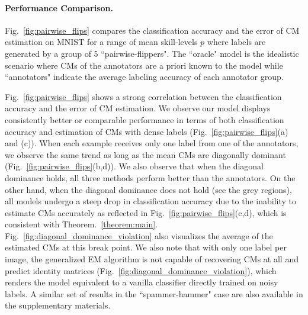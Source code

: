 \paragraph{Performance Comparison.} Fig.~\ref{fig:pairwise_flips} compares the classification accuracy and the error of CM estimation on MNIST for a range of mean skill-levels $p$ where labels are generated by a group of 5 ``pairwise-flippers". The ``oracle" model is the idealistic scenario where CMs of the annotators are a priori known to the model while ``annotators" indicate the average labeling accuracy of each annotator group.

Fig.~\ref{fig:pairwise_flips} shows a strong correlation between the classification accuracy and the error of CM estimation. We observe our model displays consistently better or comparable performance in terms of both classification accuracy and estimation of CMs with dense labels (Fig.~\ref{fig:pairwise_flips}(a) and (c)). When each example receives only one label from one of the annotators, we observe the same trend as long as the mean CMs are diagonally dominant (Fig.~\ref{fig:pairwise_flips}(b,d)). We also observe that when the diagonal dominance holds, all three methods perform better than the annotators. On the other hand, when the diagonal dominance does not hold (see the grey regions), all models undergo a steep drop in classification accuracy due to the inability to estimate CMs accurately as reflected in Fig.~\ref{fig:pairwise_flips}(c,d), which is consistent with Theorem.~\ref{theorem:main}. Fig.~\ref{fig:diagonal_dominance_violation} also visualizes the average of the estimated CMs at this break point. We also note that with only one label per image, the generalized EM algorithm  \cite{raykar2009supervised,raykar2010learning} is not capable of recovering CMs at all and predict identity matrices (Fig.~\ref{fig:diagonal_dominance_violation}), which renders the model equivalent to a vanilla classifier directly trained on noisy labels. A similar set of results in the ``spammer-hammer" case are also available in the supplementary materials.


